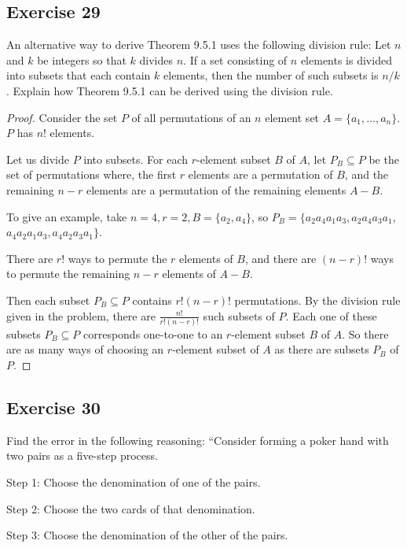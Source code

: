 \documentclass[14pt]{extarticle}
\newcommand{\dps}{\displaystyle}
\newcommand{\cy}{\color{cyan}}
\begin{document}
\subsection{Exercise 29}
An alternative way to derive Theorem 9.5.1 uses the following division rule: Let \(n\) and \(k\) be integers so that \(k\) 
divides \(n\). If a set consisting of \(n\) elements is divided into subsets that each contain \(k\) elements, then 
the number of such subsets is \(n/k\). Explain how Theorem 9.5.1 can be derived using the division rule.

\begin{proof}
Consider the set \(P\) of all permutations of an \(n\) element set \(A = \{a_1, \ldots, a_n\}\). \(P\) has \(n!\) elements.

Let us divide \(P\) into subsets. For each \(r\)-element subset \(B\) of \(A\), let \(P_B \subseteq P\) be the set of 
permutations where, the first \(r\) elements are a permutation of \(B\), and the remaining \(n-r\) elements are a permutation 
of the remaining elements \(A - B\).

To give an example, take \(n = 4, r = 2, B = \{a_2, a_4\}\), so \(P_B = \{a_2a_4a_1a_3, a_2a_4a_3a_1\), \\ \(a_4a_2a_1a_3, 
a_4a_2a_3a_1\}\).

There are \(r!\) ways to permute the \(r\) elements of \(B\), and there are \((n-r)!\) ways to permute the remaining 
\(n-r\) elements of \(A - B\).

Then each subset \(P_B \subseteq P\) contains \(r!(n-r)!\) permutations. By the division rule given in the problem, there 
are \(\dps \frac{n!}{r!(n-r)!}\) such subsets of \(P\).
Each one of these subsets \(P_B \subseteq P\) corresponds one-to-one to an \(r\)-element subset \(B\) of \(A\). So there are 
as many ways of choosing an \(r\)-element subset of \(A\) as there are subsets \(P_B\) of \(P\).
\end{proof}

\subsection{Exercise 30}
Find the error in the following reasoning: “Consider forming a poker hand with two pairs as a five-step process.

{\cy Step 1:} Choose the denomination of one of the pairs.

{\cy Step 2:} Choose the two cards of that denomination.

{\cy Step 3:} Choose the denomination of the other of the pairs.
\end{document}
